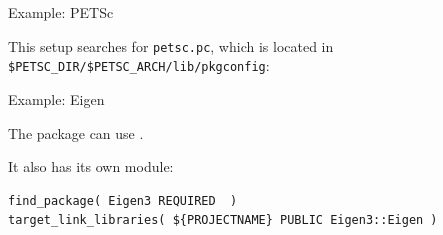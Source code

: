
 {Example: PETSc}


This  setup searches for \lstinline[language=shell]{petsc.pc},
which is located in \verb+$PETSC_DIR/$PETSC_ARCH/lib/pkgconfig+:
%



 {Example: Eigen}


The  package can use .



It also has its own module:

\begin{lstlisting}
find_package( Eigen3 REQUIRED  )
target_link_libraries( ${PROJECTNAME} PUBLIC Eigen3::Eigen )
\end{lstlisting}








